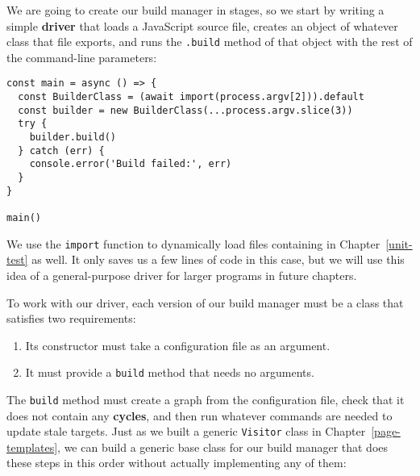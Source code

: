 \documentclass[krantzl]{krantz}
\newcommand{\chapref}[1]{Chapter~\ref{#1}}
\newcommand{\glossref}[1]{\textbf{#1}}
\begin{document}
We are going to create our build manager in stages,
so we start by writing a simple \glossref{driver} that loads a JavaScript source file,
creates an object of whatever class that file exports,
and runs the \texttt{.build} method of that object with the rest of the command-line parameters:


\begin{lstlisting}[frame=single,frameround=tttt]
const main = async () => {
  const BuilderClass = (await import(process.argv[2])).default
  const builder = new BuilderClass(...process.argv.slice(3))
  try {
    builder.build()
  } catch (err) {
    console.error('Build failed:', err)
  }
}

main()
\end{lstlisting}



\noindent We use the \texttt{import} function to dynamically load files containing in \chapref{unit-test} as well.
It only saves us a few lines of code in this case,
but we will use this idea of a general-purpose driver for larger programs in future chapters.


To work with our driver,
each version of our build manager must be a class that satisfies two requirements:

\begin{enumerate}

\item 

Its constructor must take a configuration file as an argument.



\item 

It must provide a \texttt{build} method that needs no arguments.



\end{enumerate}


The \texttt{build} method must create a graph from the configuration file,
check that it does not contain any \glossref{cycles},
and then run whatever commands are needed to update stale targets.
Just as we built a generic \texttt{Visitor} class in \chapref{page-templates},
we can build a generic base class for our build manager that does these steps in this order
without actually implementing any of them:
\end{document}
